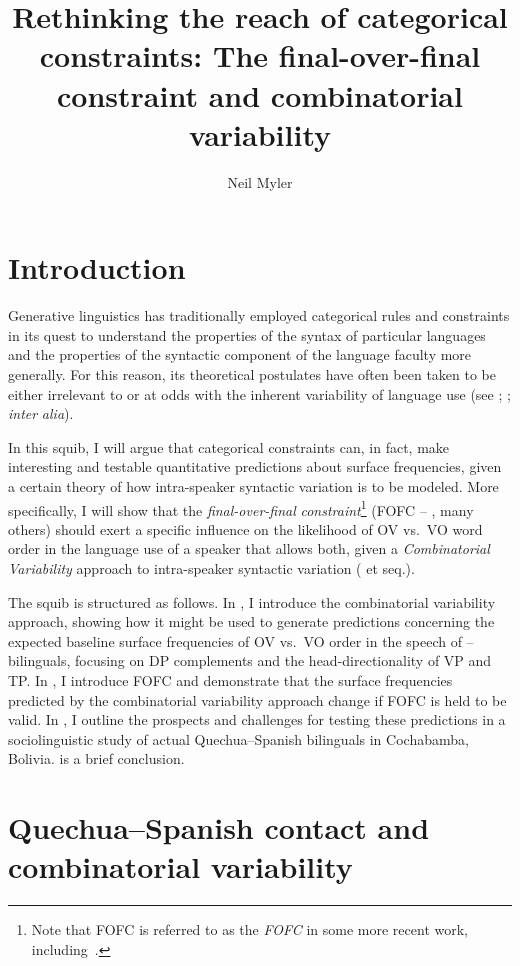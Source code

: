 \documentclass[output=paper]{langsci/langscibook}
\author{Neil Myler\affiliation{Boston University}}
\title{Rethinking the reach of categorical constraints: The final-over-final
constraint and combinatorial variability}
\begin{document}
\glsresetall

\section{Introduction}

Generative linguistics has traditionally employed categorical rules and
constraints in its quest to understand the properties of the syntax of
particular languages and the properties of the syntactic component of the
language faculty more generally.  For this reason, its theoretical postulates
have often been taken to be either irrelevant to or at odds with the inherent
variability of language use (see \citealt{Guy2005}; \citealt{Newmeyer2005};
\emph{inter} \emph{alia}).

In this squib, I will argue that categorical constraints can, in fact, make
interesting and testable quantitative predictions about surface frequencies,
given a certain theory of how intra-speaker syntactic variation is to be
modeled.  More specifically, I will show that the \emph{final-over-final}
\emph{constraint}\footnote{Note that \gls{FOFC} is referred to as
the \emph{\glsdesc{FOFC}} in some more recent work,
including~\textcite{SheeBibRobHol2017}.}
(\gls{FOFC} -- \citealt{BibHolRob2014,BibNewShee2009b,Holmberg2000,Walkden2009},
many others) should exert a specific influence on the likelihood of OV vs.\ VO
word order in the language use of a speaker that allows both, given a
\emph{Combinatorial} \emph{Variability} approach to intra-speaker syntactic
variation (\citealt{Adger2006} et seq.).

The squib is structured as follows.  In , I introduce the
combinatorial variability approach, showing how it might be used to generate
predictions concerning the expected baseline surface frequencies of OV vs.\ VO
order in the speech of -- bilinguals, focusing on DP complements
and the head-directionality of VP and TP\@. In , I introduce
FOFC and demonstrate that the surface frequencies predicted by the
combinatorial variability ap\-proach change if \gls{FOFC} is held to be valid.
In , I outline the prospects and challenges for testing
these predictions in a sociolinguistic study of actual Quechua--Spanish
bilinguals in Cochabamba, Bolivia.  is a brief conclusion.

\section{Quechua--Spanish contact and combinatorial
variability}\label{sec-30:key:1}
\end{document}
